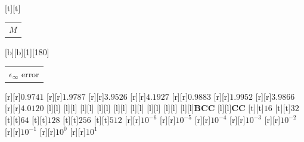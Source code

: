 %    
%
%
\begin{psfrags}%
\psfragscanon%
%
[t][t]{\color[rgb]{0,0,0}\setlength{\tabcolsep}{0pt}\begin{tabular}{c}$M$\end{tabular}}%
[b][b][1][180]{\color[rgb]{0,0,0}\setlength{\tabcolsep}{0pt}\begin{tabular}{c}$\epsilon_{\infty}$
error\end{tabular}}%
%
%
[r][r]{\color[rgb]{0,0,0}$0.9741$}%
[r][r]{\color[rgb]{0,0,0}$1.9787$}%
[r][r]{\color[rgb]{0,0,0}$3.9526$}%
[r][r]{\color[rgb]{0,0,0}$4.1927$}%
%
[r][r]{\color[rgb]{0,0,0}$0.9883$}%
[r][r]{\color[rgb]{0,0,0}$1.9952$}%
[r][r]{\color[rgb]{0,0,0}$3.9866$}%
[r][r]{\color[rgb]{0,0,0}$4.0120$}%
%
%
[l][l]{\color[rgb]{0,0,0}}%
[l][l]{\color[rgb]{0,0,0}}%
[l][l]{\color[rgb]{0,0,0}}%
[l][l]{\color[rgb]{0,0,0}}%
[l][l]{\color[rgb]{0,0,0}}%
[l][l]{\color[rgb]{0,0,0}}%
[l][l]{\color[rgb]{0,0,0}}%
[l][l]{\color[rgb]{0,0,0}}%
%
[l][l]{\color[rgb]{0,0,0}\textbf{BCC}}%
[l][l]{\color[rgb]{0,0,0}\textbf{CC}}%
[t][t]{${16}$}%
[t][t]{${32}$}%
[t][t]{${64}$}%
[t][t]{${128}$}%
[t][t]{${256}$}%
[t][t]{${512}$}%
%
[r][r]{$10^{-6}$}%
[r][r]{$10^{-5}$}%
[r][r]{$10^{-4}$}%
[r][r]{$10^{-3}$}%
[r][r]{$10^{-2}$}%
[r][r]{$10^{-1}$}%
[r][r]{$10^{0}$}%
[r][r]{$10^{1}$}%
%

\end{psfrags}
